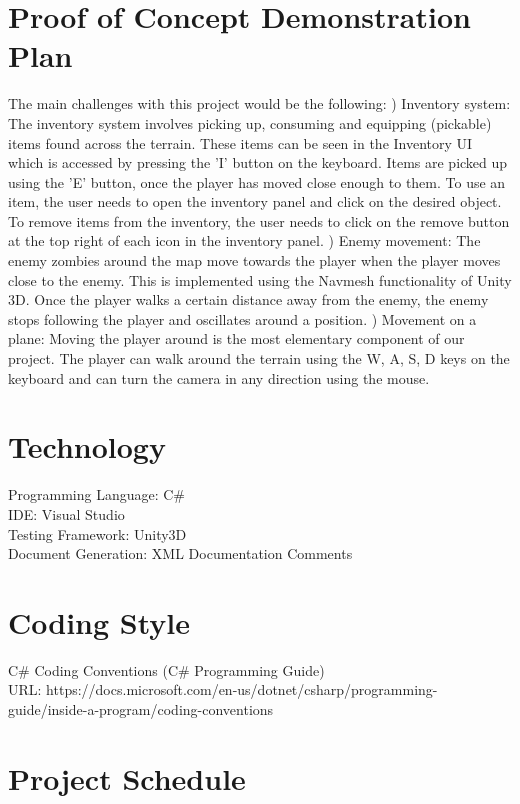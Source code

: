 \documentclass{article}
\begin{document}
\section{Proof of Concept Demonstration Plan}
The main challenges with this project would be the following: \newline
{}) Inventory system: The inventory system involves picking up, consuming and equipping (pickable) items found across the terrain. These items can be seen in the Inventory UI which is accessed by pressing the 'I' button on the keyboard. Items are picked up using the 'E' button, once the player has moved close enough to them. To use an item, the user needs to open the inventory panel and click on the desired object. To remove items from the inventory, the user needs to click on the remove button at the top right of each icon in the inventory panel.
\newline
{}) Enemy movement: The enemy zombies around the map move towards the player when the player moves close to the enemy. This is implemented using the Navmesh functionality of Unity 3D. Once the player walks a certain distance away from the enemy, the enemy stops following the player and oscillates around a position.
\newline
{}) Movement on a plane: Moving the player around is the most elementary component of our project. The player can walk around the terrain using the W, A, S, D keys on the keyboard and can turn the camera in any direction using the mouse.

\section{Technology}
Programming Language: C\# \\
IDE: Visual Studio\\
Testing Framework: Unity3D\\
Document Generation: XML Documentation Comments

\section{Coding Style}
C\# Coding Conventions (C\# Programming Guide)\\
URL: https://docs.microsoft.com/en-us/dotnet/csharp/programming-guide/inside-a-program/coding-conventions

\section{Project Schedule}
\end{document}
